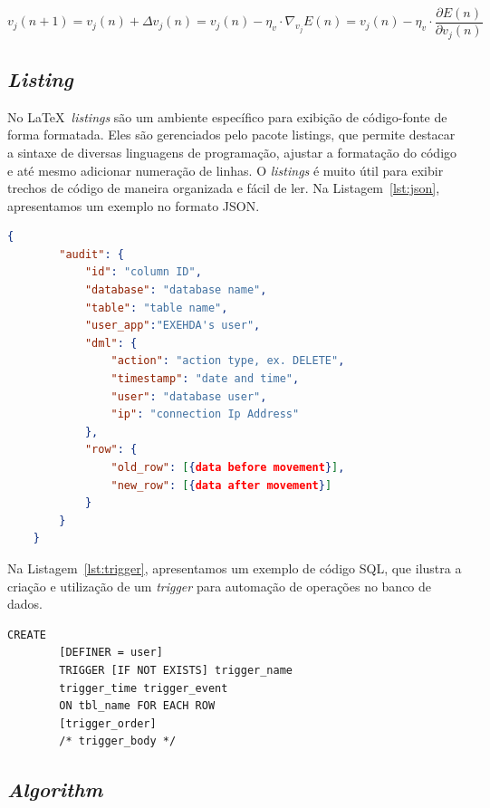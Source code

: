 \begin{equation}\label{eq:exemplo-1}
    v_j(n+1) = v_j(n) + \Delta v_j(n) =  v_j(n) - \eta_v\cdot\nabla_{v_j}E(n) = v_j(n) - \eta_v\cdot\frac{\partial E(n)}{\partial v_j(n)}
\end{equation}

\subsection{\textit{Listing}}

No \LaTeX\, \textit{listings} são um ambiente específico para exibição de código-fonte de forma formatada. Eles são gerenciados pelo pacote listings, que permite destacar a sintaxe de diversas linguagens de programação, ajustar a formatação do código e até mesmo adicionar numeração de linhas. O \textit{listings} é muito útil para exibir trechos de código de maneira organizada e fácil de ler. Na Listagem~\ref{lst:json}, apresentamos um exemplo no formato JSON.

    \begin{lstlisting}[language=json,caption={Leiaute do Campo de Auditoria do Banco de Dados},label={lst:json},firstnumber=1]
    {
    	"audit": {
    		"id": "column ID",
    		"database": "database name",
    		"table": "table name",
    		"user_app":"EXEHDA's user",
    		"dml": {
    			"action": "action type, ex. DELETE",
    			"timestamp": "date and time",
    			"user": "database user",
    			"ip": "connection Ip Address"
    		},
    		"row": {
    			"old_row": [{data before movement}],
    			"new_row": [{data after movement}]
    		}
    	}
    }
    \end{lstlisting}  

     Na Listagem~\ref{lst:trigger}, apresentamos um exemplo de código SQL, que ilustra a criação e utilização de um \textit{trigger} para automação de operações no banco de dados.

    \begin{lstlisting}[language=albandesSQL,caption={Sintaxe do \textit{Trigger} do Banco de Dados Mysql},label={lst:trigger},firstnumber=1]
    CREATE
        [DEFINER = user]
        TRIGGER [IF NOT EXISTS] trigger_name
        trigger_time trigger_event
        ON tbl_name FOR EACH ROW
        [trigger_order]
        /* trigger_body */
    \end{lstlisting}   

    \subsection{\textit{Algorithm}}

